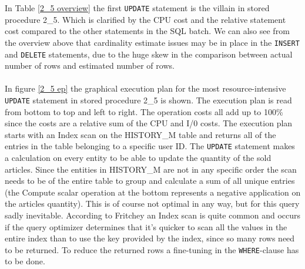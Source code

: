 \documentclass{cslthse-msc}
\begin{document}
In Table \ref{2_5 overview} the first \texttt{UPDATE} statement is the villain in stored procedure 2\_5. Which is clarified by the CPU cost and the relative statement cost compared to the other statements in the SQL batch. We can also see from the overview above that cardinality estimate issues may be in place in the \texttt{INSERT} and \texttt{DELETE} statements, due to the huge skew in the comparison between actual number of rows and estimated number of rows.\\\\    
In figure \ref{2_5 ep} the graphical execution plan for the most resource-intensive \texttt{UPDATE} statement in stored procedure 2\_5 is shown. The execution plan is read from bottom to top and left to right. The operation costs all add up to 100\% since the costs are a relative sum of the CPU and I/0 costs. The execution plan starts with an Index scan on the HISTORY\_M table and returns all of the entries in the table belonging to a specific user ID. The \texttt{UPDATE} statement makes a calculation on every entity to be able to update the quantity of the sold articles. Since the entities in HISTORY\_M are not in any specific order the scan needs to be of the entire table to group and calculate a sum of all unique entries (the Compute scalar operation at the bottom represents a negative application on the articles quantity). This is of course not optimal in any way, but for this query sadly inevitable. According to Fritchey \cite{fritchey} an Index scan is quite common and occurs if the query optimizer determines that it's quicker to scan all the values in the entire index than to use the key provided by the index, since so many rows need to be returned. To reduce the returned rows a fine-tuning in the \texttt{WHERE}-clause has to be done. \\\\ 
\end{document}
